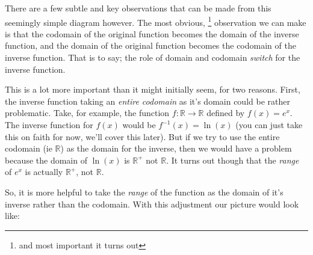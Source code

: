 \documentclass{ximera}
\begin{document}
There are a few subtle and key observations that can be made from this seemingly simple diagram however. The most obvious,%
\footnote{%
    and most important it turns out%
    }
observation we can make is that the codomain of the original function becomes the domain of the inverse function, and the domain of the original function becomes the codomain of the inverse function. That is to say; the role of domain and codomain \textit{switch} for the inverse function.

This is a lot more important than it might initially seem, for two reasons. First, the inverse function taking an \textit{entire codomain} as it's domain could be rather problematic. Take, for example, the function $f:\mathbb{R}\rightarrow\mathbb{R}$ defined by $f(x) = e^x$. The inverse function for $f(x)$ would be $f^{-1}(x) = \ln(x)$ (you can just take this on faith for now, we'll cover this later). But if we try to use the entire codomain (ie $\mathbb{R}$) as the domain for the inverse, then we would have a problem because the domain of $\ln(x)$ is $\mathbb{R}^+$ not $\mathbb{R}$. It turns out though that the \textit{range} of $e^x$ is actually $\mathbb{R}^+$, not $\mathbb{R}$. 

So, it is more helpful to take the \textit{range} of the function as the domain of it's inverse rather than the codomain. With this adjustment our picture would look like:

\begin{center}
\end{center}
\end{document}
